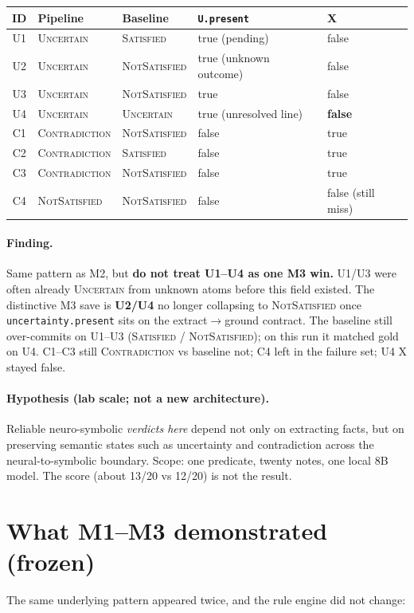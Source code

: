\documentclass[11pt,a4paper]{article}
\newcommand{\sat}{\textsc{Satisfied}}
\newcommand{\nsat}{\textsc{NotSatisfied}}
\newcommand{\unc}{\textsc{Uncertain}}
\newcommand{\con}{\textsc{Contradiction}}
\begin{document}
\begin{center}
\begin{tabular}{@{}c l l l l@{}}
\toprule
ID & Pipeline & Baseline & \texttt{U.present} & X \\
\midrule
U1 & \unc & \sat & true (pending) & false \\
U2 & \unc & \nsat & true (unknown outcome) & false \\
U3 & \unc & \nsat & true & false \\
U4 & \unc & \unc & true (unresolved line) & \textbf{false} \\
C1 & \con & \nsat & false & true \\
C2 & \con & \sat & false & true \\
C3 & \con & \nsat & false & true \\
C4 & \nsat & \nsat & false & false (still miss) \\
\bottomrule
\end{tabular}
\end{center}

\paragraph{Finding.}
Same pattern as M2, but \textbf{do not treat U1--U4 as one M3 win.}
U1/U3 were often already \unc{} from unknown atoms before this field existed.
The distinctive M3 save is \textbf{U2/U4} no longer collapsing to \nsat{} once \texttt{uncertainty.present} sits on the extract$\rightarrow$ground contract.
The baseline still over-commits on U1--U3 (\sat{} / \nsat); on this run it matched gold on U4.
C1--C3 still \con{} vs baseline not; C4 left in the failure set; U4 X stayed false.

\paragraph{Hypothesis (lab scale; not a new architecture).}
Reliable neuro-symbolic \emph{verdicts here} depend not only on extracting facts, but on preserving semantic states such as uncertainty and contradiction across the neural-to-symbolic boundary.
Scope: one predicate, twenty notes, one local 8B model. The score (about 13/20 vs 12/20) is not the result.

\section{What M1--M3 demonstrated (frozen)}

The same underlying pattern appeared twice, and the rule engine did not change:
\end{document}
